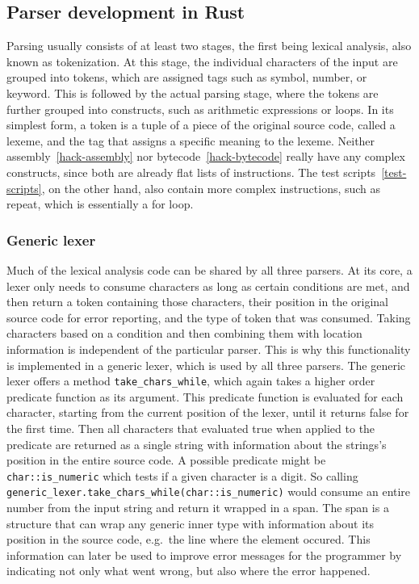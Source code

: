 \subsection{Parser development in Rust} \label{parser-dev}
Parsing usually consists of at least two stages, the first being lexical analysis, also known as tokenization.
At this stage, the individual characters of the input are grouped into tokens, which are assigned tags such as symbol, number, or keyword.
This is followed by the actual parsing stage, where the tokens are further grouped into constructs, such as arithmetic expressions or loops.
In its simplest form, a token is a tuple of a piece of the original source code, called a lexeme, and the tag that assigns a specific meaning to the lexeme.
Neither assembly~\ref{hack-assembly} nor bytecode~\ref{hack-bytecode} really have any complex constructs, since both are already flat lists of instructions.
The test scripts~\ref{test-scripts}, on the other hand, also contain more complex instructions, such as repeat, which is essentially a for loop.

\subsubsection{Generic lexer}
Much of the lexical analysis code can be shared by all three parsers.
At its core, a lexer only needs to consume characters as long as certain conditions are met, and then return a token containing those characters, their position in the original source code for error reporting, and the type of token that was consumed.
Taking characters based on a condition and then combining them with location information is independent of the particular parser.
This is why this functionality is implemented in a generic lexer, which is used by all three parsers.
The generic lexer offers a method \verb+take_chars_while+, which again takes a higher order predicate function as its argument.
This predicate function is evaluated for each character, starting from the current position of the lexer, until it returns false for the first time.
Then all characters that evaluated true when applied to the predicate are returned as a single string with information about the strings's position in the entire source code.
A possible predicate might be \verb+char::is_numeric+ which tests if a given character is a digit.
So calling \verb+generic_lexer.take_chars_while(char::is_numeric)+ would consume an entire number from the input string and return it wrapped in a span.
\label{spans}
The span is a structure that can wrap any generic inner type with information about its position in the source code, e.g.\ the line where the element occured.
This information can later be used to improve error messages for the programmer by indicating not only what went wrong, but also where the error happened.

